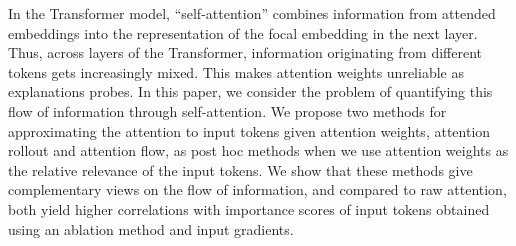 In the Transformer model, ``self-attention'' combines information from attended embeddings into the representation of the focal embedding in the next layer. Thus, across layers of the Transformer, information originating from different tokens gets increasingly mixed. This makes attention weights unreliable as explanations probes. In this paper, we consider the problem of quantifying this flow of information through self-attention. We propose two methods for approximating the attention to input tokens given attention weights, attention rollout and attention flow, as post hoc methods when we use attention weights as the relative relevance of the input tokens. We show that these methods give complementary views on the flow of information, and compared to raw attention, both yield higher correlations with importance scores of input tokens obtained using an ablation method and input gradients.
